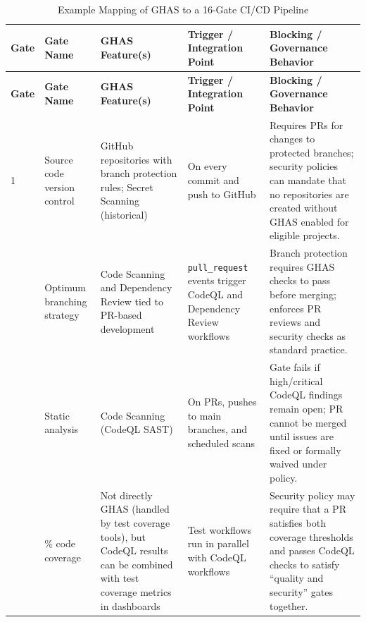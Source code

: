 \documentclass[11pt]{article}
\begin{document}
\begin{longtable}{%
  >{\raggedright\arraybackslash}p{1cm}%
  >{\raggedright\arraybackslash}p{\dimexpr(\linewidth-1cm-10\tabcolsep)/4\relax}%
  >{\raggedright\arraybackslash}p{\dimexpr(\linewidth-1cm-10\tabcolsep)/4\relax}%
  >{\raggedright\arraybackslash}p{\dimexpr(\linewidth-1cm-10\tabcolsep)/4\relax}%
  >{\raggedright\arraybackslash}p{\dimexpr(\linewidth-1cm-10\tabcolsep)/4\relax}%
}
\caption{Example Mapping of GHAS to a 16-Gate CI/CD Pipeline}
\label{tab:ghas-16-gates}\\
\toprule
\textbf{Gate} & \textbf{Gate Name} & \textbf{GHAS Feature(s)} & \textbf{Trigger / Integration Point} & \textbf{Blocking / Governance Behavior} \\
\midrule
\endfirsthead

\toprule
\textbf{Gate} & \textbf{Gate Name} & \textbf{GHAS Feature(s)} & \textbf{Trigger / Integration Point} & \textbf{Blocking / Governance Behavior} \\
\midrule
\endhead

1 & Source code version control &
GitHub repositories with branch protection rules; Secret Scanning (historical) &
On every commit and push to GitHub &
Requires PRs for changes to protected branches; security policies can mandate that no repositories are created without GHAS enabled for eligible projects. \\[0.5em]

2 & Optimum branching strategy &
Code Scanning and Dependency Review tied to PR-based development &
\texttt{pull\_request} events trigger CodeQL and Dependency Review workflows &
Branch protection requires GHAS checks to pass before merging; enforces PR reviews and security checks as standard practice. \\[0.5em]

3 & Static analysis &
Code Scanning (CodeQL SAST) &
On PRs, pushes to main branches, and scheduled scans &
Gate fails if high/critical CodeQL findings remain open; PR cannot be merged until issues are fixed or formally waived under policy. \\[0.5em]

4 & 80\% code coverage &
Not directly GHAS (handled by test coverage tools), but CodeQL results can be combined with test coverage metrics in dashboards &
Test workflows run in parallel with CodeQL workflows &
Security policy may require that a PR satisfies both coverage thresholds and passes CodeQL checks to satisfy ``quality and security'' gates together. \\[0.5em]


\end{longtable}
\end{document}
